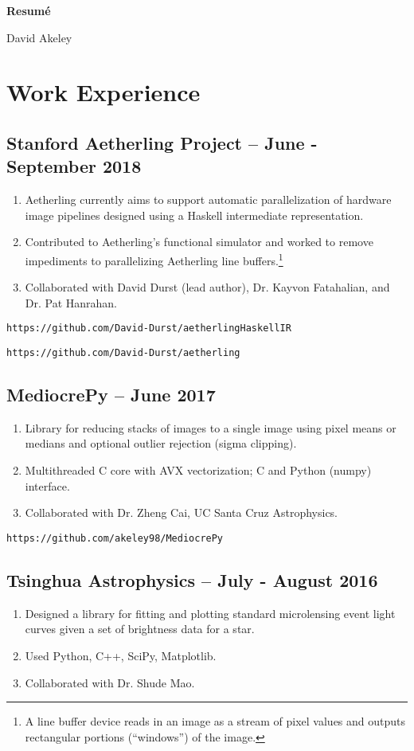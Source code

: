 \documentclass[11pt]{article}
\begin{document}
\begin{center}
\Large{\textbf{Resum\'e}}

\normalsize David Akeley
\end{center}

\section{Work Experience}

\subsection{Stanford Aetherling Project -- June - September 2018}
\begin{enumerate}
\item Aetherling currently aims to support automatic parallelization
  of hardware image pipelines designed using a Haskell intermediate
  representation.
\item Contributed to Aetherling's functional simulator and worked to
  remove impediments to parallelizing Aetherling line
  buffers.\footnote{A line buffer device reads in an image as a stream
    of pixel values and outputs rectangular portions (``windows'') of
    the image.}
\item Collaborated with David Durst (lead author), Dr. Kayvon
  Fatahalian, and Dr. Pat Hanrahan.
\end{enumerate}
\texttt{https://github.com/David-Durst/aetherlingHaskellIR}

\texttt{https://github.com/David-Durst/aetherling}

\subsection{MediocrePy -- June 2017}
\begin{enumerate}
\item Library for reducing stacks of images to a single image using pixel
means or medians and optional outlier rejection (sigma clipping).
\item Multithreaded C core with AVX vectorization; C and Python (numpy)
  interface.
\item Collaborated with Dr. Zheng Cai, UC Santa Cruz Astrophysics.
\end{enumerate}
\texttt{https://github.com/akeley98/MediocrePy}
\subsection{Tsinghua Astrophysics -- July - August 2016}
\begin{enumerate}
\item Designed a library for fitting and plotting standard
  microlensing event light curves given a set of brightness
  data for a star.
\item Used Python, C++, SciPy, Matplotlib.
\item Collaborated with Dr. Shude Mao.
\end{enumerate}
\end{document}
